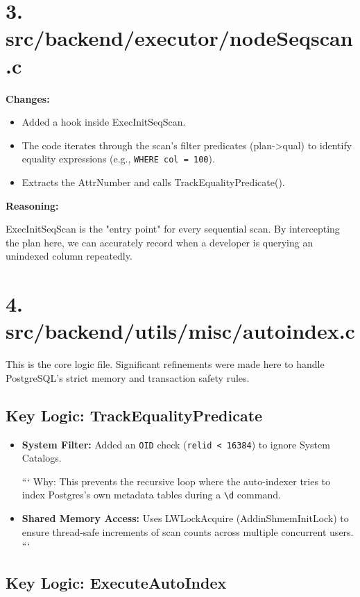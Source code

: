 \documentclass[12pt]{article}
\begin{document}
\section*{3. src/backend/executor/nodeSeqscan.c}

\textbf{Changes:}
\begin{itemize}[leftmargin=*]
\item Added a hook inside ExecInitSeqScan.
\item The code iterates through the scan's filter predicates (plan->qual) to identify equality expressions (e.g., \texttt{WHERE col = 100}).
\item Extracts the AttrNumber and calls TrackEqualityPredicate().
\end{itemize}

\noindent\textbf{Reasoning:}

\noindent ExecInitSeqScan is the "entry point" for every sequential scan. By intercepting the plan here, we can accurately record when a developer is querying an unindexed column repeatedly.

\section*{4. src/backend/utils/misc/autoindex.c}

This is the core logic file. Significant refinements were made here to handle PostgreSQL’s strict memory and transaction safety rules.

\subsection*{Key Logic: TrackEqualityPredicate}

\begin{itemize}[leftmargin=*]
\item \textbf{System Filter:} Added an \texttt{OID} check (\texttt{relid < 16384}) to ignore System Catalogs.

```
Why: This prevents the recursive loop where the auto-indexer tries to index Postgres's own metadata tables during a \texttt{\textbackslash d} command.

\item \textbf{Shared Memory Access:} Uses LWLockAcquire (AddinShmemInitLock) to ensure thread-safe increments of scan counts across multiple concurrent users.
```

\end{itemize}

\subsection*{Key Logic: ExecuteAutoIndex}
\end{document}
